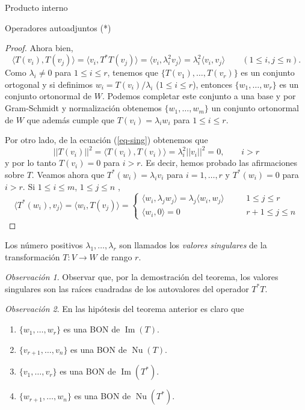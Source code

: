 \documentclass[a4paper,12pt,twoside,spanish,reqno]{amsbook}
\numberwithin{equation}{section}
\theoremstyle{definition}
\theoremstyle{remark}
\newtheorem*{obs*}{Observaci\'on}
\newcommand\im{\operatorname{Im}}
\renewcommand\nu{\operatorname{Nu}}
\newcommand{\la}{\langle}
\newcommand{\ra}{\rangle}
\begin{document}
\begin{chapter}{Producto interno}
\begin{section}{Operadores autoadjuntos (*)}
\begin{proof}
            Ahora bien,
            \begin{equation}\label{eq-sing}
                \la T(v_i),T(v_j) \ra = \la v_i,T^*T(v_j) \ra = \la v_i, \lambda_i^2 v_j \ra  = \lambda_i^2\la v_i,  v_j \ra\qquad (1\le i,j \le n).
            \end{equation}
            Como $\lambda_i \ne 0$ para $1 \le i \le r$, tenemos que $\{T(v_1),\ldots,T(v_r)\}$ es un conjunto ortogonal y si definimos $w_i = T(v_i)/\lambda_i$ ($1 \le i \le r$), entonces $\{w_1,\ldots,w_r\}$ es un conjunto ortonormal de $W$. Podemos completar este conjunto a una base y por  Gram-Schmidt y  normalización obtenemos $\{w_1,\ldots,w_m\}$ un conjunto ortonormal de $W$ que además cumple  que $T(v_i) = \lambda_i w_i$ para   $1 \le i \le r$.
            
            Por otro lado,  de la ecuación (\ref{eq-sing}) obtenemos que 
            $$
            ||T(v_i)||^2 = \la T(v_i),T(v_i) \ra = \lambda_i^2||v_i||^2 = 0, \qquad i>r
            $$     
            y por lo tanto $T(v_i)=0$ para $i>r$.  Es decir, hemos probado las afirmaciones sobre $T$. Veamos ahora que $T^*(w_i) = \lambda_i v_i$ para $i=1,\ldots,r$ y $T^*(w_i) = 0$ para $i > r$. Si $ 1 \le i \le m$, $ 1 \le j \le n$ ,
            $$
            \la T^*(w_i),v_j \ra = \la w_i,T(v_j) \ra = \left\{
            \begin{matrix}
            \la w_i,\lambda_j w_j \ra = \lambda_j\la w_i,w_j \ra&\quad&1 \le j \le r \\
            \la w_i,0 \ra = 0&\quad&r+1 \le j \le n 
            \end{matrix}
            \right.
            $$
        \end{proof}
        
        Los número positivos $\lambda_1,\ldots,\lambda_r$ son llamados los \textit{valores singulares} de la transformación $T: V \to W$ de rango $r$. 
        
        \begin{obs*}
            Observar que, por la demostración del teorema, los valores singulares son las raíces cuadradas de los autovalores del operador $T^*T$. 
        \end{obs*}
        
        
        \begin{obs*}
            En las hipótesis del teorema anterior es claro que
            \begin{enumerate}
                \item $\{w_1,\ldots,w_r \}$ es una BON de  $\im(T)$.
                \item $\{v_{r+1},\ldots,v_n \}$ es una BON de  $\nu(T)$.
                \item $\{v_1,\ldots,v_r \}$ es una BON de  $\im(T^*)$.
                \item $\{w_{r+1},\ldots,w_n \}$ es una BON de  $\nu(T^*)$.
            \end{enumerate}
        \end{obs*}
        

\end{section}
\end{chapter}
\end{document}
